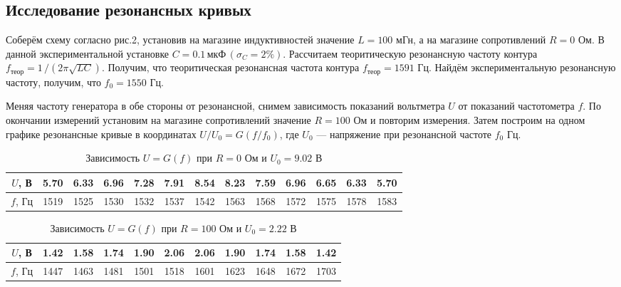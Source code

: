 \documentclass[12pt]{article}
\begin{document}
\subsection*{Исследование резонансных кривых}
	\par
		Соберём схему согласно рис.2, установив на магазине индуктивностей значение $L = 100$ мГн, а на магазине сопротивлений $R = 0$ Ом. В данной экспериментальной установке $C = 0.1 \, \text{мкФ} \, \left(\sigma_C = 2 \% \right)$. Рассчитаем теоритическую резонансную частоту контура $f_\text{теор} = 1 \, / \left(2 \pi \sqrt{LC} \right)$. Получим, что теоритическая резонансная частота контура $f_\text{теор} = 1591$ Гц. Найдём экспериментальную резонансную частоту, получим, что $f_0 = 1550 $ Гц.
	\par
		Меняя частоту генератора в  обе стороны от резонансной, снимем зависимость показаний вольтметра $U$ от показаний частотометра $f$. По окончании измерений установим на магазине сопротивлений значение $R = 100$ Ом и повторим измерения. Затем построим на одном графике резонансные кривые в координатах $U / U_0 = G(f / f_0)$, где $U_0$ --- напряжение при резонансной частоте $f_0$ Гц.		
	\begin{table}[h!]
		\centering
		\begin{tabular}{|c|c|c|c|c|c|c|c|c|c|c|c|c|}
		\hline
		$U$, В & 5.70 & 6.33 & 6.96 & 7.28 & 7.91 & 8.54 & 8.23 & 7.59 & 6.96 & 6.65 & 6.33 &  5.70 \\
		\hline
		$f$, Гц & 1519 & 1525 & 1530 & 1532 & 1537 & 1542 & 1563 & 1568 & 1572 & 1575 & 1578 & 1583 \\
		\hline
		\end{tabular}
		\caption{Зависимость $U = G(f)$ при $R = 0$ Ом и $U_0 = 9.02$ В}		
	\end{table}
	\begin{table}[h!]
		\centering
		\begin{tabular}{|c|c|c|c|c|c|c|c|c|c|c|}
		\hline
		$U$, В & 1.42 & 1.58 & 1.74 & 1.90 & 2.06 & 2.06 & 1.90 & 1.74 & 1.58 & 1.42 \\
		\hline
		$f$, Гц & 1447 & 1463 & 1481 & 1501 & 1518 & 1601 & 1623 & 1648 & 1672 & 1703 \\
		\hline
		\end{tabular}
		\caption{Зависимость $U = G(f)$ при $R = 100$ Ом и $U_0 = 2.22$ В }		
	\end{table}	
\end{document}
